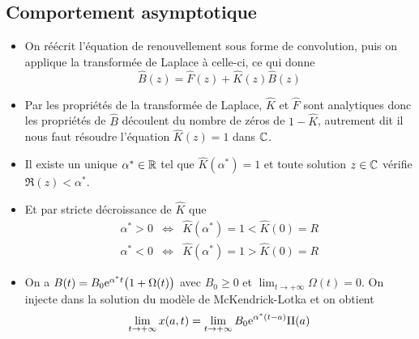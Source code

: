 \subsection{Comportement asymptotique}
\begin{frame}
    \begin{itemize}
        \item On réécrit l'équation de renouvellement sous forme de convolution, puis on applique la transformée de Laplace à celle-ci, ce qui donne 
        \begin{equation*}
            \hat{B}(z) = \hat{F}(z) + \hat{K}(z)\hat{B}(z)
        \end{equation*} \pause
        \item Par les propriétés de la transformée de Laplace, $\hat{K}$ et $\hat{F}$ sont analytiques donc les propriétés de $\hat{B}$ découlent du nombre de zéros de $1-\hat{K}$, autrement dit il nous faut résoudre l'équation $\hat{K}(z) = 1$ dans $\mathbb{C}$. \pause
        \item Il existe un unique $\alpha^* \in \mathbb{R}$ tel que $\hat{K}(\alpha^*) = 1$ et toute solution $z \in \mathbb{C}$ vérifie $\Re(z) < \alpha^*$. \pause
        \item Et par stricte décroissance de $\hat{K}$ que 
        \begin{eqnarray*}
            \alpha^* >0 &\iff& \hat{K}(\alpha^*) = 1 < \hat{K}(0) = R \\
            \alpha^* < 0 &\iff& \hat{K}(\alpha^*) = 1 > \hat{K}(0)=R
        \end{eqnarray*} \pause
        \item On a $B(t) = B_0\mathrm{e}^{\alpha^*t}\big(1+\Omega(t)\big)$ avec $B_0 \geq 0$ et $\displaystyle{\lim_{t \to +\infty}} \Omega(t)=0$. On injecte dans la solution du modèle de McKendrick-Lotka et on obtient 
        \begin{equation*}
            \lim_{t \to +\infty} x(a,t) = \lim_{t \to +\infty} B_0\mathrm{e}^{\alpha^*(t-a)}\Pi(a)
        \end{equation*}
    \end{itemize}
\end{frame}